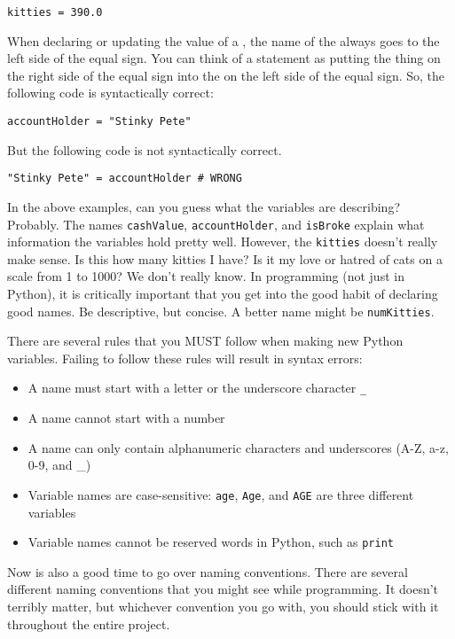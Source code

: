 \begin{lstlisting}[style=pippython]
kitties = 390.0
\end{lstlisting}
When declaring or updating the value of a , the name of the  always goes to the left side of the equal sign. You can think of a  statement as putting the thing on the right side of the equal sign into the  on the left side of the equal sign. So, the following code is syntactically correct:
\begin{lstlisting}[style=pippython]
accountHolder = "Stinky Pete"
\end{lstlisting}
But the following code is not syntactically correct.
\begin{lstlisting}[style=pippython]
"Stinky Pete" = accountHolder # WRONG
\end{lstlisting}
In the above examples, can you guess what the variables are describing? Probably. The  names \verb|cashValue|, \verb|accountHolder|, and \verb|isBroke| explain what information the variables hold pretty well. However, the  \verb|kitties| doesn't really make sense. Is this how many kitties I have? Is it my love or hatred of cats on a scale from 1 to 1000? We don't really know. In programming (not just in Python), it is critically important that you get into the good habit of declaring good  names. Be descriptive, but concise. A better  name might be \verb|numKitties|.\par
There are several rules that you MUST follow when making new Python variables. Failing to follow these rules will result in syntax errors:
\begin{itemize}
    \item A  name must start with a letter or the underscore character \verb|_|
    \item A  name cannot start with a number
    \item A  name can only contain alphanumeric characters and underscores (A-Z, a-z, 0-9, and \_)
    \item Variable names are case-sensitive: \verb|age|, \verb|Age|, and \verb|AGE| are three different variables
    \item Variable names cannot be reserved words in Python, such as \verb|print|
\end{itemize}
Now is also a good time to go over naming conventions. There are several different naming conventions that you might see while programming. It doesn't terribly matter, but whichever convention you go with, you should stick with it throughout the entire project.\par
